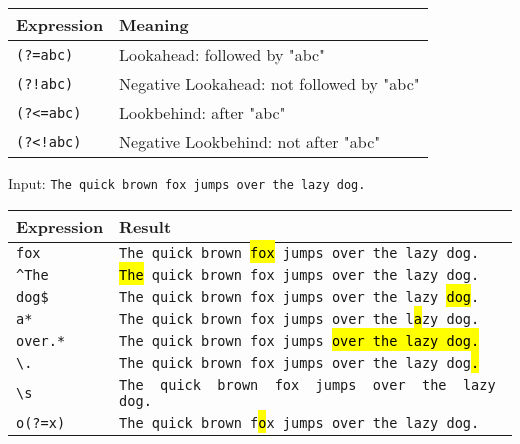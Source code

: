 \documentclass[a4paper,10pt]{article}
\begin{document}
\begin{multicols}{2}
    \begin{tcolorbox}[colback=white, colframe=black, title=Extended Features]
        \renewcommand{\arraystretch}{1.3}
        \begin{tabular}{p{2cm}p{5cm}}
            \hline
            \textbf{Expression} & \textbf{Meaning}                          \\
            \hline
            \texttt{(?=abc)}  & Lookahead: followed by "abc"                \\
            \texttt{(?!abc)}  & Negative Lookahead: not followed by "abc" \\
            \texttt{(?<=abc)} & Lookbehind: after "abc"                      \\
            \texttt{(?<!abc)} & Negative Lookbehind: not after "abc"       \\
        \end{tabular}
    \end{tcolorbox}

    \begin{tcolorbox}[colback=white, colframe=black, title=Examples]
        Input: \texttt{The quick brown fox jumps over the lazy dog.} \\[5mm]
        \begin{tabular}{p{2cm}p{5cm}}
            \hline
            \textbf{Expression} & \textbf{Result} \\
            \hline
            \texttt{fox} & \texttt{The quick brown \hl{fox} jumps over the lazy dog.} \\
            \texttt{\textasciicircum The} & \texttt{\hl{The} quick brown fox jumps over the lazy dog.} \\
            \texttt{dog\$} & \texttt{The quick brown fox jumps over the lazy \hl{dog}.} \\
            \texttt{a*} & \texttt{The quick brown fox jumps over the l\hl{a}zy dog.} \\
            \texttt{over.*} & \texttt{The quick brown fox jumps \hl{over the lazy dog.}} \\
            \texttt{\textbackslash .} & \texttt{The quick brown fox jumps over the lazy dog\hl{.}} \\
            \texttt{\textbackslash s} & \texttt{The\hl{ }quick\hl{ }brown\hl{ }fox\hl{ }jumps\hl{ }over\hl{ }the\hl{ }lazy\hl{ }dog.} \\
            \texttt{o(?=x)} & \texttt{The quick brown f\hl{o}x jumps over the lazy dog.} \\
        \end{tabular}
    \end{tcolorbox}

\end{multicols}
\end{document}
